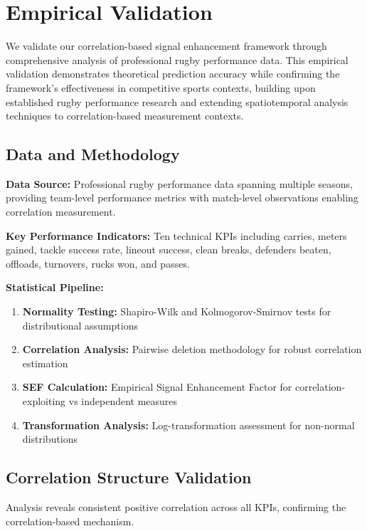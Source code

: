 \section{Empirical Validation}

We validate our correlation-based signal enhancement framework through comprehensive analysis of professional rugby performance data. This empirical validation demonstrates theoretical prediction accuracy while confirming the framework's effectiveness in competitive sports contexts, building upon established rugby performance research \cite{bennett2019descriptive, scott2023performance, bennett2021predicting, scott2023classifying} and extending spatiotemporal analysis techniques \cite{bornn2021spatiotemporal} to correlation-based measurement contexts.

\subsection{Data and Methodology}

\textbf{Data Source:} Professional rugby performance data spanning multiple seasons, providing team-level performance metrics with match-level observations enabling correlation measurement.

\textbf{Key Performance Indicators:} Ten technical KPIs including carries, meters gained, tackle success rate, lineout success, clean breaks, defenders beaten, offloads, turnovers, rucks won, and passes.

\textbf{Statistical Pipeline:}
\begin{enumerate}
    \item \textbf{Normality Testing:} Shapiro-Wilk and Kolmogorov-Smirnov tests for distributional assumptions
    \item \textbf{Correlation Analysis:} Pairwise deletion methodology for robust correlation estimation  
    \item \textbf{SEF Calculation:} Empirical Signal Enhancement Factor for correlation-exploiting vs independent measures
    \item \textbf{Transformation Analysis:} Log-transformation assessment for non-normal distributions
\end{enumerate}

\subsection{Correlation Structure Validation}

Analysis reveals consistent positive correlation across all KPIs, confirming the correlation-based mechanism.


